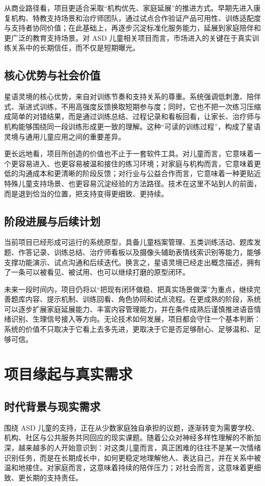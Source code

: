 从商业路径看，项目更适合采取“机构优先、家庭延展”的推进方式。早期先进入康复机构、特教支持场景和治疗师团队，通过试点合作验证产品可用性、训练适配度与支持者协同价值；在此基础上，再逐步沉淀标准化服务能力，延展到家庭陪伴和更广泛的教育支持场景。对 ASD 儿童相关项目而言，市场进入的关键在于真实训练关系中的长期信任，而不仅是短期曝光。

\section{核心优势与社会价值}
星语灵境的核心优势，来自对训练节奏和支持关系的尊重。系统强调低刺激、陪伴式、渐进式训练，不用高强度反馈换取短期参与度；同时，它也不把一次练习压缩成简单的对错结果，而是通过训练总结、过程记录和看板回看，让家长、治疗师与机构能够围绕同一段训练形成更一致的理解。这种“可读的训练过程”，构成了星语灵境与通用儿童应用之间的重要差异。

更长远地看，项目所创造的价值也不止于一套软件工具。对儿童而言，它意味着一个更容易进入、也更容易被温和接住的练习环境；对家庭与机构而言，它意味着更低的沟通成本和更清晰的阶段反馈；对行业与公益合作而言，它意味着一种更贴近特殊儿童支持场景、也更容易沉淀经验的方法路径。技术在这里不站到人的前面，而是退到恰当的位置，把支持变得更细致、更持续。

\section{阶段进展与后续计划}
当前项目已经形成可运行的系统原型，具备儿童档案管理、五类训练活动、题库发题、作答记录、训练总结、治疗师看板以及摄像头辅助表情线索识别等能力，能够支撑功能演示、试点沟通和后续迭代。换言之，星语灵境已经走出概念描述，拥有了一条可以被看见、被试用、也可以继续打磨的原型闭环。

未来一段时间内，项目仍将以“把现有闭环做稳、把真实场景做深”为重点，继续完善题库内容、提示机制、训练回看、角色协同和试点流程。在更成熟的阶段，系统可以逐步扩展家庭延展能力、丰富内容管理能力，并在条件成熟后谨慎推进语音情绪识别、生理信号接入等方向。无论技术如何发展，项目都会守住一个基本判断：系统的价值不只取决于它看上去多先进，更取决于它是否足够耐心、足够温和、足够可信。


\chapter{项目缘起与真实需求}

\section{时代背景与现实需求}
围绕 ASD 儿童的支持，正在从少数家庭独自承担的议题，逐渐转变为需要学校、机构、社区与公共服务共同回应的现实课题。随着公众对神经多样性理解的不断加深，越来越多的人开始意识到：对这类儿童而言，真正困难的往往不是某一次情绪识别任务，而是在长期成长中，如何更稳定地理解他人、表达自己，并在关系中被温和地接住。对家庭而言，这意味着持续的陪伴压力；对社会而言，这意味着更细致、更长期的支持责任。

